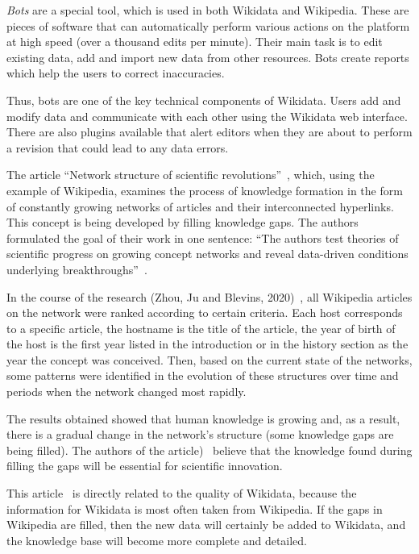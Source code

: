 \textit{Bots} are a special tool, which is used in both Wikidata and Wikipedia. These are pieces of software that can automatically perform various actions on the platform at high speed (over a thousand edits per minute). Their main task is to edit existing data, add and import new data from other resources. Bots create reports which help the users to correct inaccuracies.

Thus, bots are one of the key technical components of Wikidata. Users add and modify data and communicate with each other using the Wikidata web interface. There are also plugins available that alert editors when they are about to perform a revision that could lead to any data errors.

The article ``Network structure of scientific revolutions''~, which, using the example of Wikipedia, examines the process of knowledge formation in the form of constantly growing networks of articles and their interconnected hyperlinks. This concept is being developed by filling knowledge gaps. The authors formulated the goal of their work in one sentence: ``The authors test theories of scientific progress on growing concept networks and reveal data-driven conditions underlying breakthroughs''~.

In the course of the research (Zhou, Ju and Blevins, 2020)~, all Wikipedia articles on the network were ranked according to certain criteria. Each host corresponds to a specific article, the hostname is the title of the article, the year of birth of the host is the first year listed in the introduction or in the history section as the year the concept was conceived. Then, based on the current state of the networks, some patterns were identified in the evolution of these structures over time and periods when the network changed most rapidly.

The results obtained showed that human knowledge is growing and, as a result, there is a gradual change in the network's structure (some knowledge gaps are being filled). The authors of the article)~ believe that the knowledge found during filling the gaps will be essential for scientific innovation.

This article~ is directly related to the quality of Wikidata, because the information for Wikidata is most often taken from Wikipedia. If the gaps in Wikipedia are filled, then the new data will certainly be added to Wikidata, and the knowledge base will become more complete and detailed.
